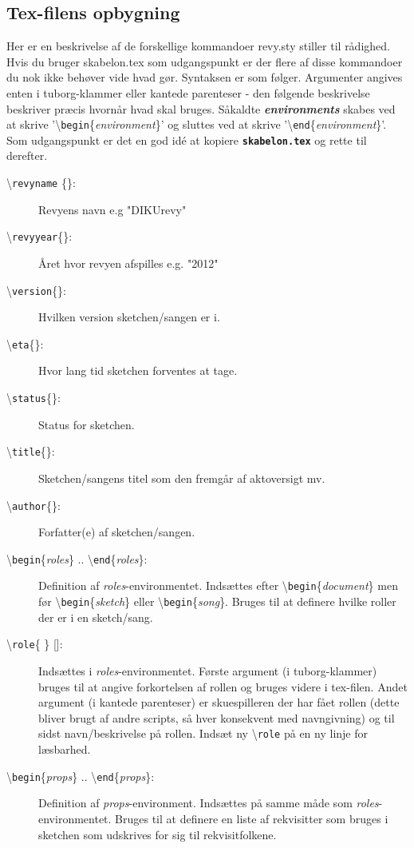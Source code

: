 \documentclass{article}
\newcommand{\env}[1]{\textit{#1}}
\newcommand{\fname}[1]{\textbf{\texttt{#1}}}
\newcommand{\cmd}[1]{\textbackslash \texttt{#1}}
\newcommand{\envbegin}[1]{\cmd{begin}\{\env{#1}\}}
\newcommand{\envend}[1]{\cmd{end}\{\env{#1}\}}
\newcommand{\term}[1]{\textbf{\textit{#1}}}
\begin{document}
\subsection{Tex-filens opbygning}
Her er en beskrivelse af de forskellige kommandoer revy.sty stiller til
rådighed. Hvis du bruger skabelon.tex som udgangspunkt er der flere af
disse kommandoer du nok ikke behøver vide hvad gør.
Syntaksen er som følger. Argumenter angives enten i tuborg-klammer eller
kantede parenteser - den følgende beskrivelse beskriver præcis hvornår
hvad skal bruges. Såkaldte \term{environments} skabes ved at skrive
'\envbegin{environment}' og sluttes ved at skrive
'\envend{environment}'.
Som udgangspunkt er det en god idé at kopiere \fname{skabelon.tex} og rette til
derefter.

\begin{description}
\item[\cmd{revyname} \{\}:] Revyens navn e.g "DIKUrevy"
\item[\cmd{revyyear}\{\}:] Året hvor revyen afspilles e.g. "2012"
\item[\cmd{version}\{\}:] Hvilken version sketchen/sangen er i.
\item[\cmd{eta}\{\}:] Hvor lang tid sketchen forventes at tage.
\item[\cmd{status}\{\}:] Status for sketchen.
\item[\cmd{title}\{\}:] Sketchen/sangens titel som den fremgår af aktoversigt mv.
\item[\cmd{author}\{\}:] Forfatter(e) af sketchen/sangen.
\item[\envbegin{roles} .. \envend{roles}:]
Definition af \env{roles}-environmentet.
Indsættes efter \envbegin{document} men før \envbegin{sketch} eller
\envbegin{song}. Bruges til at definere hvilke roller der er i en
sketch/sang.
\item[\cmd{role}\{ \} {[]}:] Indsættes i \env{roles}-environmentet. Første argument (i
tuborg-klammer) bruges
til at angive forkortelsen af rollen og bruges videre i tex-filen. Andet
argument (i kantede parenteser) er skuespilleren der har fået rollen (dette bliver brugt af
andre scripts, så hver konsekvent med navngivning) og til sidst navn/beskrivelse på
rollen. Indsæt ny \cmd{role} på en ny linje for læsbarhed.
\item[\envbegin{props} .. \envend{props}:] Definition af \env{props}-environment.
Indsættes på samme måde som \env{roles}-environmentet. Bruges til at
definere en liste af rekvisitter som bruges i sketchen som udskrives for
sig til rekvisitfolkene.

\end{description}
\end{document}
